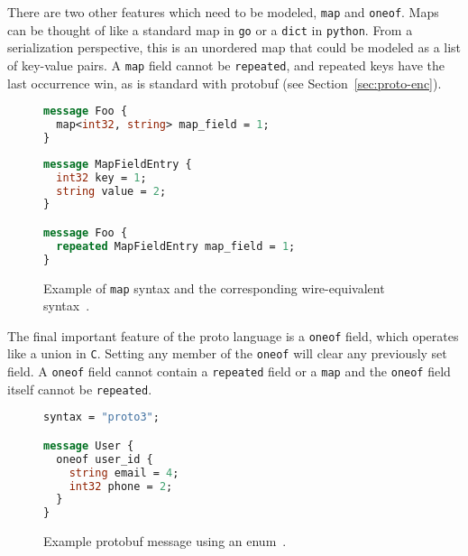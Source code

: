 \documentclass[11pt]{article}
\theoremstyle{definition}
\begin{document}
There are two other features which need to be modeled, \texttt{map} and
\texttt{oneof}. Maps can be thought of like a standard map in \texttt{go} or a
\texttt{dict} in \texttt{python}. From a serialization perspective, this is an
unordered map that could be modeled as a list of key-value pairs. A \texttt{map}
field cannot be \texttt{repeated}, and repeated keys have the last occurrence
win, as is standard with protobuf (see Section~\ref{sec:proto-enc}).

\begin{figure}[H]
	\centering
	\begin{minipage}[bt]{0.43\textwidth}
		\begin{lstlisting}[language=proto]
message Foo {
  map<int32, string> map_field = 1;
}\end{lstlisting}
	\end{minipage}
	\hspace{0.5cm}
	\begin{minipage}[bt]{0.48\textwidth}
		\begin{lstlisting}[language=proto]
message MapFieldEntry {
  int32 key = 1;
  string value = 2;
}

message Foo {
  repeated MapFieldEntry map_field = 1;
}\end{lstlisting}
	\end{minipage}

	\caption{Example of \texttt{map} syntax and the corresponding
		wire-equivalent syntax~\cite{LanguageGuideProto}.}
	\label{fig:proto-map}
\end{figure}

The final important feature of the proto language is a \texttt{oneof} field,
which operates like a union in \texttt{C}. Setting any member of the
\texttt{oneof} will clear any previously set field. A \texttt{oneof} field
cannot contain a \texttt{repeated} field or a \texttt{map} and the
\texttt{oneof} field itself cannot be \texttt{repeated}.

\begin{figure}[H]
	\begin{lstlisting}[language=proto]
syntax = "proto3";

message User {
  oneof user_id {
    string email = 4;
    int32 phone = 2;
  }
}\end{lstlisting}

	\caption{Example protobuf message using an enum~\cite{LanguageGuideProto}.}
	\label{fig:proto-enum2}
\end{figure}
\end{document}
